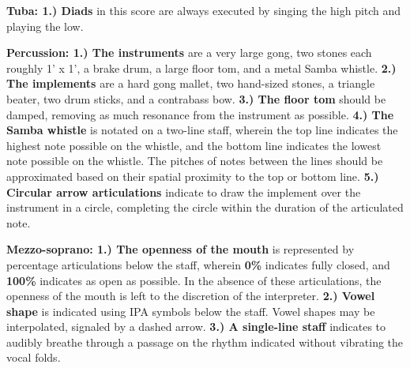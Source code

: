 \documentclass[11pt]{article}
\begin{document}
\begingroup
\textbf{Tuba: 1.) Diads} in this score are always executed by singing the high pitch and playing the low. 
\endgroup

\begingroup
\textbf{Percussion: 1.) The instruments} are a very large gong, two stones each roughly 1' x 1', a brake drum, a large floor tom, and a metal Samba whistle. \textbf{2.) The implements} are a hard gong mallet, two hand-sized stones, a triangle beater, two drum sticks, and a contrabass bow. \textbf{3.) The floor tom} should be damped, removing as much resonance from the instrument as possible. \textbf{4.) The Samba whistle} is notated on a two-line staff, wherein the top line indicates the highest note possible on the whistle, and the bottom line indicates the lowest note possible on the whistle. The pitches of notes between the lines should be approximated based on their spatial proximity to the top or bottom line. \textbf{5.) Circular arrow articulations} indicate to draw the implement over the instrument in a circle, completing the circle within the duration of the articulated note.
\endgroup

\begingroup
\textbf{Mezzo-soprano: 1.) The openness of the mouth} is represented by percentage articulations below the staff, wherein \textbf{0\%} indicates fully closed, and \textbf{100\%} indicates as open as possible. In the absence of these articulations, the openness of the mouth is left to the discretion of the interpreter. \textbf{2.) Vowel shape} is indicated using IPA symbols below the staff. Vowel shapes may be interpolated, signaled by a dashed arrow. \textbf{3.) A single-line staff} indicates to audibly breathe through a passage on the rhythm indicated without vibrating the vocal folds.
\endgroup
\end{document}

